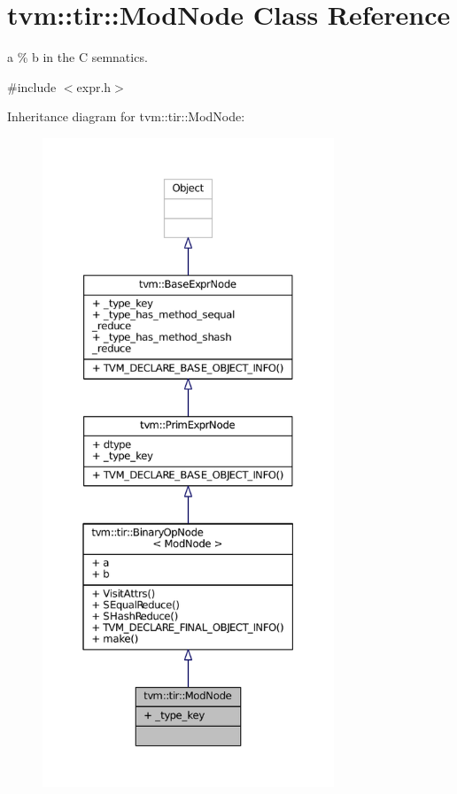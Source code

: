 \hypertarget{classtvm_1_1tir_1_1ModNode}{}\section{tvm\+:\+:tir\+:\+:Mod\+Node Class Reference}
\label{classtvm_1_1tir_1_1ModNode}


a \% b in the C semnatics.  




{\ttfamily \#include $<$expr.\+h$>$}



Inheritance diagram for tvm\+:\+:tir\+:\+:Mod\+Node\+:
\nopagebreak
\begin{figure}[H]
\begin{center}
\leavevmode
\includegraphics[height=550pt]{classtvm_1_1tir_1_1ModNode__inherit__graph}
\end{center}
\end{figure}


